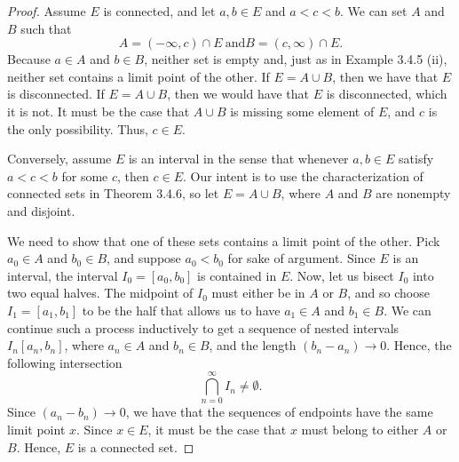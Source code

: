 \begin{proof}
Assume \( E \) is connected, and let \( a, b \in E  \) and \( a < c < b  \). We can set \( A  \) and \( B  \) such that 
\[  A = (-\infty, c ) \cap E ~ \text{and} B = (c, \infty ) \cap E.  \]
Because \( a \in A  \) and \( b \in B \), neither set is empty and, just as in Example 3.4.5 (ii), neither set contains a limit point of the other. If \( E = A \cup B  \), then we have that \( E  \) is disconnected. If \( E = A \cup B  \), then we would have that \( E  \) is disconnected, which it is not. It must be the case that \( A \cup B  \) is missing some element of \( E  \), and \( c \) is the only possibility. Thus, \( c \in E  \).

Conversely, assume \( E  \) is an interval in the sense that whenever \( a, b \in E  \) satisfy \( a < c < b  \) for some \( c  \), then  \( c \in E  \). Our intent is to use the characterization of connected sets in Theorem 3.4.6, so let \( E = A \cup B \), where \( A  \) and \( B \) are nonempty and disjoint. 

We need to show that one of these sets contains a limit point of the other. Pick \( a_0 \in A  \) and \( b_0 \in B \), and suppose \( a_0 < b_0  \) for sake of argument. Since \( E  \) is an interval, the interval \( I_0 = [a_0, b_0 ] \) is contained in \( E  \). Now, let us bisect \( I_0 \) into two equal halves. The midpoint of \( I_0  \) must either be in \( A \) or \( B \), and so choose \( I_1 = [a_1, b_1 ]  \) to be the half that allows us to have \( a_1 \in A  \) and \( b_1 \in B \). We can continue such a process inductively to get a sequence of nested intervals \( I_n [a_n, b_n] \), where \( a_n \in A \) and \( b_n \in B \), and the length \( (b_n - a_n) \to 0  \). Hence, the following intersection
\[ \bigcap_{ n=0  }^{ \infty  } I_n \neq \emptyset. \]
Since \( (a_n - b_n ) \to 0  \), we have that the sequences of endpoints have the same limit point \( x  \). Since \( x \in E  \), it must be the case that \( x  \) must belong to either \( A  \) or \( B \). Hence, \( E \) is a connected set. 
\end{proof}


